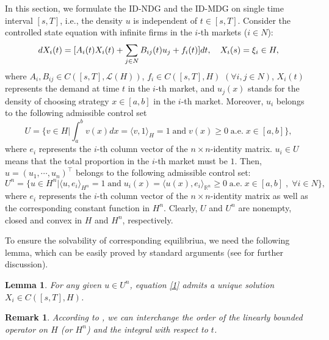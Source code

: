 \documentclass[10pt]{article}
\newtheorem{lemma}{Lemma}[section]
\newtheorem{remark}{Remark}[section]
\begin{document}
In this section, we formulate the  ID-NDG and the ID-MDG on single time interval $[s,T]$, i.e., the density $u$ is independent of $t\in [s,T]$. Consider the controlled state equation with infinite firms in the $i$-th markets ($i\in N$):
\begin{equation}\label{1}
dX_i(t)=[A_i(t)X_i(t)+\sum_{j\in N}B_{ij}(t)u_j+f_i(t)]dt,\\
\quad X_i(s)=\xi_i\in H,
\end{equation}
 where $A_i,B_{ij}\in C([s,T],\mathcal{L}(H))$, $f_i\in C([s,T],H)$ $(\forall i,j\in N)$, $X_i(t)$ represents the demand at time $t$ in  the $i$-th market, and $u_j(x)$ stands for the density of choosing strategy $x\in [a,b]$ in   the $i$-th market.  Moreover, $u_i$  belongs to the following  admissible control set
$$
U=\{v\in H|\int_a^bv(x)dx=\langle v,1\rangle_H=1\;\mbox{and}\;v(x)\geq0\;\mbox{a.e.}\;x\in[a,b]\},
$$
 where  $e_i$ represents the $i$-th column vector of the $n\times n$-identity matrix. $u_i\in U$ means that the total proportion in the $i$-th market must be $1$. Then, $u=(u_1,\cdots,u_n)^{\top}$ belongs to the following admissible control set:
$$
 U^n=\{u\in H^n|\langle u,e_i\rangle_{H^n}=1\;\mbox{and}\;
 u_i(x)=\langle u(x),e_i\rangle_{\mathbb{R}^n}\geq0\;\mbox{a.e.}\;x\in[a,b]\;,\;\forall i\in N\},
$$
 where  $e_i$ represents the $i$-th column vector of the $n\times n$-identity matrix as well as the corresponding
 constant function in $H^n$. Clearly, $U$ and $U^n$ are nonempty, closed and convex in $H$ and $H^n$, respectively.

To ensure the solvability of corresponding equilibriua, we need the following lemma, which can be easily proved by standard arguments  (see \citep{MR3236753, MR4363403} for further discussion).
\begin{lemma}\label{8}
For any given $u\in U^n$, equation \eqref{1} admits   a unique solution $X_i\in C([s,T],H)$.
\end{lemma}
\begin{remark}
According to \citep[Proposition 1.6]{MR3236753}, we can  interchange the order of the linearly bounded operator on $H$ (or $H^n$) and the integral with respect to $t$.
\end{remark}
\end{document}
